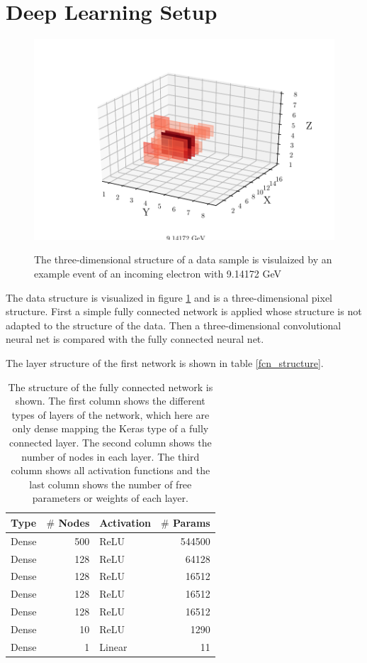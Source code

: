 \documentclass[12pt, a4paper]{thesis}
\begin{document}
\section{Deep Learning Setup}
\label{sec:orgb3e1899}

\begin{figure}[htbp]
\centering
\includegraphics[width=.9\linewidth]{../images/data_display.pdf}
\label{data_display}
\caption{
The three-dimensional structure of a data sample is visulaized by an example event of an incoming electron with 9.14172 GeV}
\end{figure}

The data structure is visualized in figure \ref{data_display} and is a
three-dimensional pixel structure. First a simple fully connected
network is applied whose structure is not adapted to the structure of
the data. Then a three-dimensional convolutional neural net is
compared with the fully connected neural net.

The layer structure of the first network is shown in table \ref{fcn_structure}.

\begin{table}[htbp]
  \label{fcn$_{structure}$}
  \caption{ The structure of the fully connected network is shown. The
    first column shows the different types of layers of the network,
    which here are only dense mapping the Keras type of a fully
    connected layer. The second column shows the number of nodes in
    each layer. The third column shows all activation functions and
    the last column shows the number of free parameters or weights of
    each layer.}
\centering
\begin{tabular}{lrlr}
Type & \(\#\) Nodes & Activation & \(\#\) Params\\
\hline
Dense & 500 & ReLU & 544500\\
Dense & 128 & ReLU & 64128\\
Dense & 128 & ReLU & 16512\\
Dense & 128 & ReLU & 16512\\
Dense & 128 & ReLU & 16512\\
Dense & 10 & ReLU & 1290\\
Dense & 1 & Linear & 11\\
\end{tabular}
\end{table}
\end{document}
